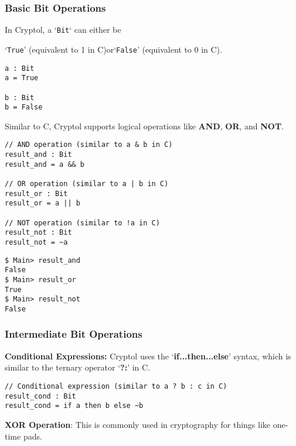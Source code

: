 \subsubsection{Basic Bit Operations}

\begin{tcolorbox}[colframe=defcolor,title={\color{white}\bf Data Type: \texttt{Bit}}]
In Cryptol, a `\texttt{Bit}` can either be \begin{center}
`\texttt{True}' (equivalent to 1 in C)\quad or\quad `\texttt{False}' (equivalent to 0 in C).
\end{center}
\end{tcolorbox}

\begin{lstlisting}[style=cryptol]
a : Bit
a = True

b : Bit
b = False
\end{lstlisting}

\noindent Similar to C, Cryptol supports logical operations like \textbf{AND}, \textbf{OR}, and \textbf{NOT}.
\begin{lstlisting}[style=cryptol]
// AND operation (similar to a & b in C)
result_and : Bit
result_and = a && b

// OR operation (similar to a | b in C)
result_or : Bit
result_or = a || b

// NOT operation (similar to !a in C)
result_not : Bit
result_not = ~a
\end{lstlisting}

\begin{lstlisting}[style=zsh]
$ Main> result_and
False
$ Main> result_or
True
$ Main> result_not
False 
\end{lstlisting}

\subsubsection{Intermediate Bit Operations}

\textbf{Conditional Expressions:} Cryptol uses the `\textbf{if...then...else}' syntax, which is similar to the ternary operator `\textbf{?:}' in C.

\begin{lstlisting}[style=cryptol]
// Conditional expression (similar to a ? b : c in C)
result_cond : Bit
result_cond = if a then b else ~b
\end{lstlisting}

\textbf{XOR Operation}: This is commonly used in cryptography for things like one-time pads.

